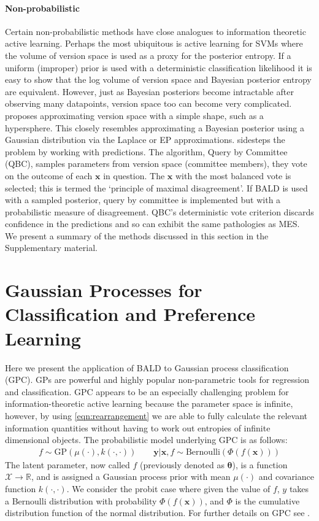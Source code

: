\documentclass{article}
\newcommand{\x}{\bm{x}}
\newcommand{\y}{\bm{y}}
\newcommand{\param}{\bm{\theta}}
\newcommand{\ourmethod}{BALD } %
\begin{document}
\paragraph{Non-probabilistic} Certain non-probabilistic methods have close analogues to information theoretic active learning. Perhaps the most ubiquitous is active learning for SVMs \cite{tong2001,seung1992} where the volume of version space is used as a proxy for the posterior entropy. If a uniform (improper) prior is used with a deterministic classification likelihood it is easy to show that the log volume of version space and Bayesian posterior entropy are equivalent. However, just as Bayesian posteriors become intractable after observing many datapoints, version space too can become very complicated. \cite{tong2001} proposes approximating version space with a simple shape, such as a hypersphere. This closely resembles approximating a Bayesian posterior using a Gaussian distribution via the Laplace or EP approximations. \cite{seung1992} sidesteps the problem by working with predictions. The algorithm, Query by Committee (QBC), samples parameters from version space (committee members), they vote on the outcome of each $\x$ in question. The $\x$ with the most balanced vote is selected; this is termed the `principle of maximal disagreement'. If \ourmethod is used with a sampled posterior, query by committee is implemented but with a probabilistic measure of disagreement. QBC's deterministic vote criterion discards confidence in the predictions and so can exhibit the same pathologies as MES. We present a summary of the methods discussed in this section in the Supplementary material.

\section{Gaussian Processes for Classification and Preference Learning\label{sec:GPC}}

Here we present the application of \ourmethod to Gaussian process classification (GPC). GPs are powerful and highly popular non-parametric tools for regression and classification. GPC appears to be an especially challenging problem for information-theoretic active learning because the parameter space is infinite, however, by using \eqref{eqn:rearrangement} we are able to fully calculate the relevant information quantities without having to work out entropies of infinite dimensional objects. The probabilistic model underlying GPC is as follows:
\begin{align}
	f \sim \mathrm{GP}(\mu(\cdot),k(\cdot,\cdot)) \qquad \y\vert\x,f \sim\mathrm{Bernoulli}(\Phi(f(\x))) 
\end{align}
The latent parameter, now called $f$ (previously denoted as $\param$), is a function $\mathcal{X}\rightarrow\mathbb{R}$, and is assigned a Gaussian process prior with mean $\mu(\cdot)$ and covariance function $k(\cdot,\cdot)$. We consider the probit case where given the value of $f$, $y$ takes a Bernoulli distribution with probability $\Phi(f(\x))$, and $\Phi$ is the cumulative distribution function of the normal distribution. For further details on GPC see \cite{rasmussen2005}.
\end{document}
